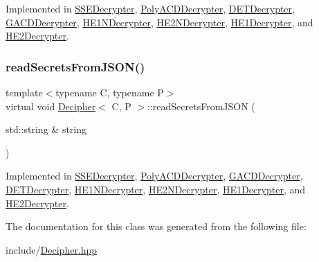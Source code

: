 Implemented in \hyperlink{classSSEDecrypter_afc1522b78aed502f8ca94163fc030ffa}{S\+S\+E\+Decrypter}, \hyperlink{classPolyACDDecrypter_a96626f2c267d9cc4b18ed25cb584d982}{Poly\+A\+C\+D\+Decrypter}, \hyperlink{classDETDecrypter_ac317ce154d64eb1fce4450c2b03a12d9}{D\+E\+T\+Decrypter}, \hyperlink{classGACDDecrypter_a92f6afd3d0a43dd5538cf6a83398ee33}{G\+A\+C\+D\+Decrypter}, \hyperlink{classHE1NDecrypter_a8e49ff8292a76884f328c566f4d1b646}{H\+E1\+N\+Decrypter}, \hyperlink{classHE2NDecrypter_aa92e4ddf62a0f2c4199722983e28b0c9}{H\+E2\+N\+Decrypter}, \hyperlink{classHE1Decrypter_a28cc03e8a37f321b8f805cc04b2e69e0}{H\+E1\+Decrypter}, and \hyperlink{classHE2Decrypter_a766f96cb2277fd3e4af59ca44a32d519}{H\+E2\+Decrypter}.

\mbox{\label{classDecipher_a39aea002012130201e12a8fa7d84dda5}} 
\subsubsection{\texorpdfstring{read\+Secrets\+From\+J\+S\+O\+N()}{readSecretsFromJSON()}}
{\footnotesize\ttfamily template$<$typename C, typename P$>$ \\
virtual void \hyperlink{classDecipher}{Decipher}$<$ C, P $>$\+::read\+Secrets\+From\+J\+S\+ON (\begin{DoxyParamCaption}\item[{std\+::string \&}]{string }\end{DoxyParamCaption})\hspace{0.3cm}{\ttfamily [pure virtual]}}



Implemented in \hyperlink{classSSEDecrypter_a1bdc685b8ea9c5bcc2b29f0c9a3ca7bf}{S\+S\+E\+Decrypter}, \hyperlink{classPolyACDDecrypter_a55e7f81c6d8d10e00e072547ac68239a}{Poly\+A\+C\+D\+Decrypter}, \hyperlink{classGACDDecrypter_a7634cc069e61c1a3cf2443fed7c2b15f}{G\+A\+C\+D\+Decrypter}, \hyperlink{classDETDecrypter_a8e32703400ead9c35a80549b011307d7}{D\+E\+T\+Decrypter}, \hyperlink{classHE1NDecrypter_a323f074a37cb4ebfbcfca4b6bdfb6737}{H\+E1\+N\+Decrypter}, \hyperlink{classHE2NDecrypter_a92b463d8e18d2f06d0680528edfd49c4}{H\+E2\+N\+Decrypter}, \hyperlink{classHE1Decrypter_af60ccc6d0afe7555a9d1468ad7047733}{H\+E1\+Decrypter}, and \hyperlink{classHE2Decrypter_a9cf1a6eae2667f6e891237589c4eeda0}{H\+E2\+Decrypter}.



The documentation for this class was generated from the following file\+:\begin{DoxyCompactItemize}
\item 
include/\hyperlink{Decipher_8hpp}{Decipher.\+hpp}\end{DoxyCompactItemize}
